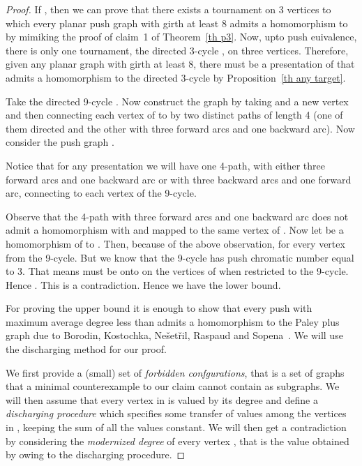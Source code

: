 \documentclass[10pt]{article}
\begin{document}
\begin{proof}
If , then we can prove that there exists a tournament on 3 vertices to which every 
planar push graph with girth at least 8 admits a homomorphism to by mimiking the proof of claim~1 of Theorem~\ref{th p3}. 
Now, upto push euivalence, there is only one tournament, the directed 3-cycle ,  on three vertices. 
Therefore, given any planar graph  with girth at least 8, there   must be a presentation 
of   that admits a homomorphism to the directed 3-cycle  by Proposition~\ref{th any target}. 

Take the directed    9-cycle . Now construct the graph  by taking 
   and a new vertex  and then connecting each vertex of  to  by two distinct paths of length 4 (one of them directed and the other with three forward arcs and one backward arc). 
Now consider the push graph . 

Notice that for any presentation  we will have  one 4-path, 
with either three forward arcs and one backward arc or with three backward arcs and one forward arc, connecting  to each vertex of the 9-cycle. 

Observe  that the 4-path  with three forward arcs and one backward arc 
does not admit a homomorphism with  and  mapped to the same vertex of .
Now let  be a homomorphism of  to . Then, because of the above observation, 
 for every vertex  from the 9-cycle. But we know that the 9-cycle has push chromatic 
number equal to 3. That means  must be onto on the vertices of  when restricted to 
the 9-cycle. Hence . This is a contradiction.
Hence we have the lower bound.  

\medskip


For proving the upper bound it is enough to show that every push  with  
maximum average degree less than    admits a homomorphism to the Paley plus graph  due to Borodin,  Kostochka, 
 Ne\v{s}et\v{r}il,  Raspaud and Sopena~\cite{mad}. 
We will use the discharging method for our proof. 


We first provide a (small) set of \textit{forbidden confgurations}, that
is a set of graphs that a minimal counterexample  to our claim cannot contain
as subgraphs. We will then assume that every vertex  in  is valued by its degree
 and define a \textit{discharging procedure} which specifies some transfer of values
among the vertices in , keeping the sum of all the values constant. We will then get
a contradiction by considering the \textit{modernized degree}  of every vertex , that
is the value obtained by  owing to the discharging procedure.



\end{proof}
\end{document}
